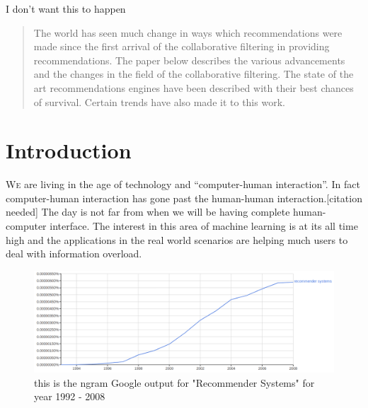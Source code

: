 \documentclass[10pt,conference]{IEEEtran}
\begin{document}
I don't want this to happen
\fi


\maketitle

\begin{abstract}
	The world has seen much change in ways which recommendations were made since the first arrival of the collaborative filtering in providing recommendations. The paper below describes the various advancements and the changes in the field of the collaborative filtering. The state of the art recommendations engines have been described with their best chances of survival. Certain trends have also made it to this work.
\end{abstract}






%
\IEEEpeerreviewmaketitle


\section{Introduction}
\lettrine[lines=2, findent=1pt, nindent=0pt]{W}e are living in the age of technology and ``computer-human interaction''. In fact computer-human interaction has gone past the human-human interaction.[citation needed] The day is not far from when we will be having complete human-computer interface.
The interest in this area of machine learning is at its all time high and the applications in the real world scenarios are helping much users to deal with information overload.


\begin{figure}
\centering
        \includegraphics[width=\textwidth]{images/history-use}
    \caption{this is the ngram Google output for "Recommender Systems" for year 1992 - 2008}
    \label{fig:verticalcell}
\end{figure}
\end{document}
